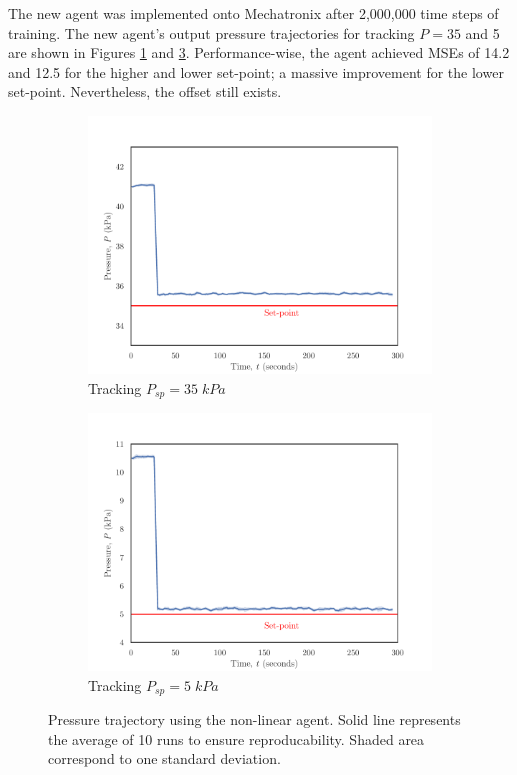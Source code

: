 The new agent was implemented onto Mechatronix after 2,000,000 time steps of training.  The new agent's output pressure trajectories for tracking $P=35$ and 5 are shown in Figures \ref{fig:system1_highsp2} and \ref{fig:system1_lowsp2}.  Performance-wise, the agent achieved  MSEs of 14.2 and 12.5 for the higher and lower set-point; a massive improvement for the lower set-point.  Nevertheless, the offset still exists.

\begin{figure}[H]
     \centering
     \begin{subfigure}{0.49\textwidth}
         \centering
         \includegraphics[width=\textwidth]{images/ch4/35SP_2state.pdf}
         \caption{Tracking $P_{sp} = 35 \; kPa$}
         \label{fig:system1_highsp2}
     \end{subfigure}
     \hfill
     \begin{subfigure}{0.49\textwidth}
         \centering
         \includegraphics[width=\textwidth]{images/ch4/5SP_2state.pdf}
         \caption{Tracking $P_{sp} = 5 \; kPa$}
         \label{fig:system1_lowsp2}
     \end{subfigure}
     \caption{Pressure trajectory using the non-linear agent. Solid line represents the average of 10 runs to ensure reproducability. Shaded area correspond to one standard deviation.}
\end{figure}



